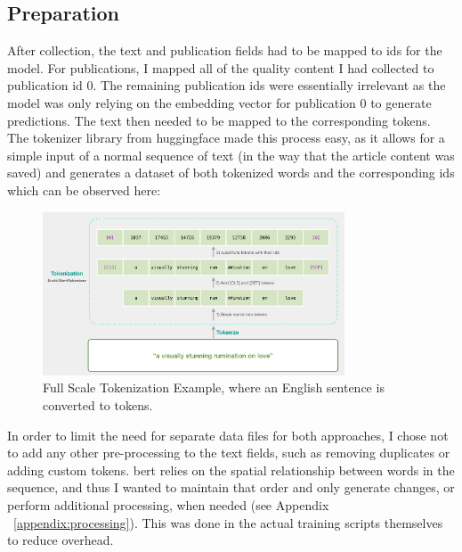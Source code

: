 \subsection{Preparation}
After collection, the text and publication fields had to be mapped to ids for the model. For publications, I mapped all of the quality content I had collected to publication id 0. The remaining publication ids were essentially irrelevant as the model was only relying on the embedding vector for publication 0 to generate predictions. The text then needed to be mapped to the corresponding tokens. The tokenizer library from huggingface made this process easy, as it allows for a simple input of a normal sequence of text (in the way that the article content was saved) and generates a dataset of both tokenized words and the corresponding ids which can be observed here:

\begin{figure}[H]
\centering
\includegraphics[width=0.8\textwidth]{fig/tokenization.png}
\caption{Full Scale Tokenization Example, where an English sentence is converted to tokens. ~\parencite{alammar_2019}
}
\label{fig:tokenization}
\end{figure}

In order to limit the need for separate data files for both approaches, I chose not to add any other pre-processing to the text fields, such as removing duplicates or adding custom tokens. \acrshort{bert} relies on the spatial relationship between words in the sequence, and thus I wanted to maintain that order and only generate changes, or perform additional processing, when needed (see Appendix ~\ref{appendix:processing}). This was done in the actual training scripts themselves to reduce overhead. 